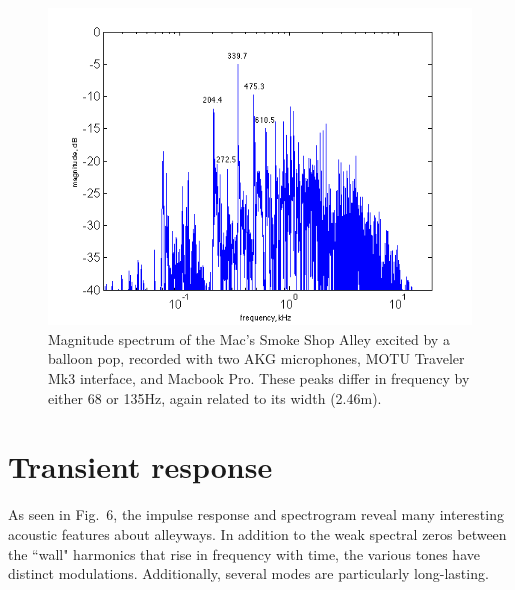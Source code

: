 \documentclass{aes137}
\begin{document}
\begin{figure}[h!] \centering \includegraphics[width=\linewidth]{images/macs_labeled_IR.png} 
\caption{Magnitude spectrum of the Mac's Smoke Shop Alley excited by a
  balloon pop, recorded with two AKG microphones, MOTU Traveler Mk3 interface, and Macbook Pro. These peaks differ in frequency by
  either 68 or 135Hz, again related to its width (2.46m).}
\end{figure}



\section{Transient response}
As seen in Fig.~6, the impulse response and spectrogram reveal many interesting acoustic features about alleyways. In addition to the weak spectral zeros between the ``wall" harmonics that rise in frequency with time, %
the various tones have distinct modulations. Additionally, several modes are particularly long-lasting.
\end{document}
